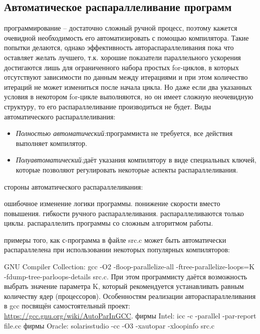 { %
	\subsection{Автоматическое распараллеливание программ}
	\Large{} программирование – достаточно сложный ручной процесс, поэтому кажется очевидной необходимость его автоматизировать с помощью компилятора. Такие попытки делаются, однако эффективность автораспараллеливания пока что оставляет желать лучшего, т.к. хорошие показатели параллельного ускорения достигаются лишь для ограниченного набора простых for-циклов, в которых отсутствуют зависимости по данным между итерациями и при этом количество итераций не может измениться после начала цикла. Но даже если два указанных условия в некотором for-цикле выполняются, но он имеет сложную неочевидную структуру, то его распараллеливание производиться не будет. Виды автоматического распараллеливания:
	\begin{itemize}
		\item\textit{Полностью автоматический:} программиста не требуется, все действия выполняет компилятор.
		\item\textit{Полуавтоматический:} даёт указания компилятору в виде специальных ключей, которые позволяют регулировать некоторые аспекты распараллеливания.
	\end{itemize}
	 стороны автоматического распараллеливания:
	\begin{itemize}
		 ошибочное изменение логики программы.
		 понижение скорости вместо повышения.
		 гибкости ручного распараллеливания.
		 распараллеливаются только циклы.
		 распараллелить программы со сложным алгоритмом работы.
	\end{itemize}
	 примеры того, как с-программа в файле src.c может быть автоматически распараллелена при использовании некоторых популярных компиляторов:
	\begin{itemize}
		 GNU Compiler Collection:	 
gcc -O2 -floop-parallelize-all -ftree-parallelize-loops=K -fdump-tree-parloops-details src.c. При этом программисту даётся возможность выбрать значение параметра K, который рекомендуется устанавливать равным количеству ядер (процессоров). Особенностям реализации автораспараллеливания в gcc посвящён самостоятельный проект:\\ \url{https://gcc.gnu.org/wiki/AutoParInGCC}. 
		 фирмы Intel:	 
icc -c -parallel -par-report file.cc
		 фирмы Oracle:	 
solarisstudio -cc -O3 -xautopar -xloopinfo src.c
	\end{itemize}
}